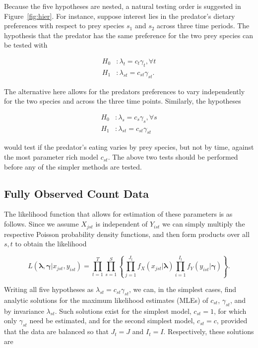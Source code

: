 \documentclass[smallextended]{svjour3}
\begin{document}
Because the five hypotheses are nested, a natural testing order is suggested in Figure~\ref{fig:hier}.  For instance, suppose interest lies in the predator's dietary preferences with respect to prey species $s_1$ and $s_2$ across three time periods.  The hypothesis that the predator has the same preference for the two prey species can be tested with

\begin{align*}
  H_0&: \lambda_t = c_t \gamma_t, \forall t \\  
  H_1&: \lambda_{st} = c_{st}\gamma_{st}.
\end{align*}

The alternative here allows for the predators preferences to vary independently for the two species and across the three time points. Similarly, the hypotheses

\begin{align*}
  H_0&: \lambda_s = c_s \gamma_s, \forall s \\  
  H_1&: \lambda_{st} = c_{st}\gamma_{st}
\end{align*}

would test if the predator's eating varies by prey species, but not by time, against the most parameter rich model $c_{st}$.  The above two tests should be performed before any of the simpler methods are tested.

\subsection{Fully Observed Count Data}
\label{sec:count}

The likelihood function that allows for estimation of these parameters is as follows.  Since we assume $X_{jst}$ is independent of $Y_{ist}$ we can simply multiply the respective Poisson probability density functions, and then form products over all $s,t$ to obtain the likelihood

\begin{equation}
  \label{eq:likelihood}
 L( \boldsymbol{\lambda}, \boldsymbol{\gamma} | x_{jst}, y_{ist}) = \prod_{t = 1}^{T} \prod_{s=1}^S \left\{ \prod_{j=1}^{J_t} f_X(x_{jst}|\boldsymbol{\lambda}) \prod_{i=1}^{I_t} f_Y(y_{ist} | \boldsymbol{\gamma}) \right\}.
\end{equation}

\noindent Writing all five hypotheses as $\lambda_{st} = c_{st}\gamma_{st}$, we can, in the simplest cases, find analytic solutions for the maximum likelihood estimates (MLEs) of $c_{st}$, $\gamma_{st}$, and by invariance $\lambda_{st}$.  Such solutions exist for the simplest model, $c_{st}=1$, for which only $\gamma_{st}$ need be estimated, and for the second simplest model, $c_{st}=c$, provided that the data are balanced so that $J_t=J$ and $I_t=I$.  Respectively, these solutions are
\end{document}
